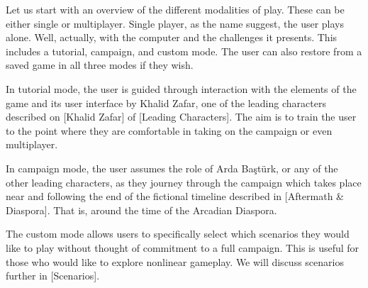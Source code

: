 
Let us start with an overview of the different modalities of play. These can be either single or multiplayer. Single player, as the name suggest, the user plays alone. Well, actually, with the computer and the challenges it presents. This includes a tutorial, campaign, and custom mode. The user can also restore from a saved game in all three modes if they wish.

In tutorial mode, the user is guided through interaction with the elements of the game and its user interface by Khalid Zafar, one of the leading characters described on [Khalid Zafar] of [Leading Characters]. The aim is to train the user to the point where they are comfortable in taking on the campaign or even multiplayer.

In campaign mode, the user assumes the role of Arda Baştürk, or any of the other leading characters, as they journey through the campaign which takes place near and following the end of the fictional timeline described in [Aftermath & Diaspora]. That is, around the time of the Arcadian Diaspora.

The custom mode allows users to specifically select which scenarios they would like to play without thought of commitment to a full campaign. This is useful for those who would like to explore nonlinear gameplay. We will discuss scenarios further in [Scenarios]. 

